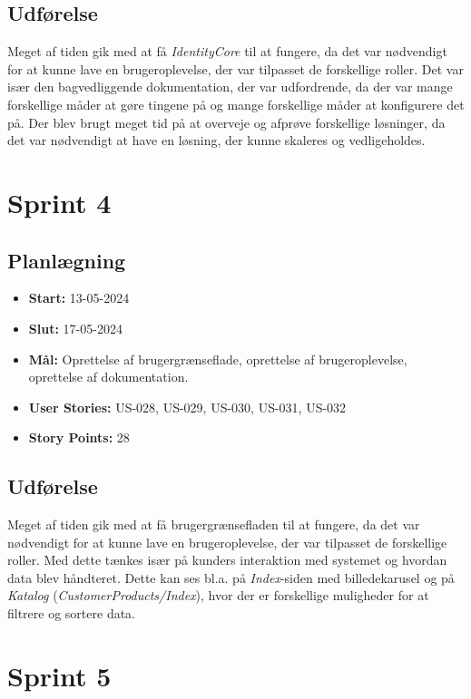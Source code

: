 \subsection{Udførelse}
\label{subsec:sprint-3-udforelse}
Meget af tiden gik med at få \emph{IdentityCore} til at fungere, da det var nødvendigt for at kunne lave en brugeroplevelse, der var tilpasset de forskellige roller.
Det var især den bagvedliggende dokumentation, der var udfordrende, da der var mange forskellige måder at gøre tingene på og mange forskellige måder at konfigurere det på.
Der blev brugt meget tid på at overveje og afprøve forskellige løsninger, da det var nødvendigt at have en løsning, der kunne skaleres og vedligeholdes.

\section{Sprint 4}
\label{sec:sprint-4}
\subsection{Planlægning}
\label{subsec:sprint-4-plan}
\begin{itemize}
    \item \textbf{Start:} 13-05-2024
    \item \textbf{Slut:} 17-05-2024
    \item \textbf{Mål:} Oprettelse af brugergrænseflade, oprettelse af brugeroplevelse, oprettelse af dokumentation.
    \item \textbf{User Stories:} US-028, US-029, US-030, US-031, US-032
    \item \textbf{Story Points:} 28
\end{itemize}

\subsection{Udførelse}
\label{subsec:sprint-4-udforelse}
Meget af tiden gik med at få brugergrænsefladen til at fungere, da det var nødvendigt for at kunne lave en brugeroplevelse, der var tilpasset de forskellige roller.
Med dette tænkes især på kunders interaktion med systemet og hvordan data blev håndteret. 
Dette kan ses bl.a. på \emph{Index}-siden med billedekarusel og på \emph{Katalog} (\emph{CustomerProducts/Index}), hvor der er forskellige muligheder for at filtrere og sortere data.

\section{Sprint 5}
\label{sec:sprint-5}
